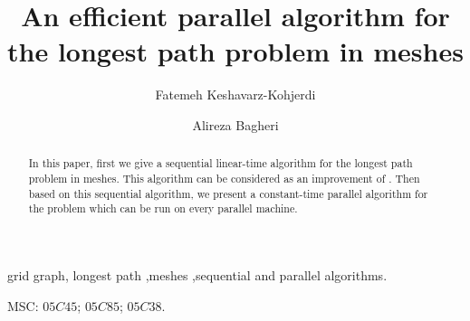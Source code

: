 \documentclass[preprint,12pt]{elsarticle}
\begin{document}
\begin{frontmatter}





\title{An efficient parallel algorithm for the longest path problem in meshes}

\address[label1]{Corresponding author: fatemeh.keshavarz@aut.ac.ir
}
\address[label2]{ ar\_bagheri@aut.ac.ir}


\author{Fatemeh Keshavarz-Kohjerdi }
\address{Department of Computer Engineering,\\ Islamic Azad University,
    North Tehran Branch, Tehran, Iran.\\}

\author{Alireza Bagheri }

\address{Department of Computer Engineering \& IT,\\ Amirkabir University of Technology, Tehran, Iran.}

\begin{abstract}
In this paper, first we give a sequential linear-time algorithm for
the longest path problem in meshes. This algorithm can be considered
as an improvement of \cite{FAA:ALAFFLPIRGG}. Then based on this
sequential algorithm, we present a constant-time parallel algorithm
for the problem which can be run on every parallel machine.
\end{abstract}

\begin{keyword} grid graph, longest path
\sep meshes \sep sequential and parallel algorithms.

MSC: $05C45$; $05C85$; $05C38$.

\end{keyword}

\end{frontmatter}
\end{document}
